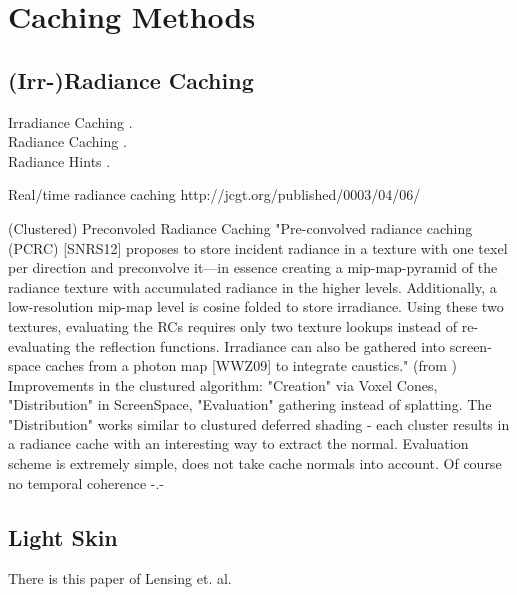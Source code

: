 \documentclass[thesis.tex]{subfiles}
\begin{document}

\section{Caching Methods}



\subsection{(Irr-)Radiance Caching}
Irradiance Caching \cite{bib:irradiancecaching}.\\

Radiance Caching \cite{bib:radiancecaching}.\\

Radiance Hints \cite{bib:radiancehints}.

Real/time radiance caching http://jcgt.org/published/0003/04/06/ \cite{bib:radiancecachechromaticcompression}

(Clustered) Preconvoled Radiance Caching \cite{bib:clusteredpreconvoledradiancecaching}
"Pre-convolved radiance caching (PCRC) [SNRS12] proposes to store incident radiance in a texture with one texel per direction and preconvolve it—in essence creating a mip-map-pyramid of the
radiance texture with accumulated radiance in the higher
levels. Additionally, a low-resolution mip-map level is cosine folded to store irradiance. Using these two textures, evaluating the RCs requires only two texture lookups instead of re-evaluating the reflection functions. Irradiance can also be gathered into screen-space caches from a photon map [WWZ09] to integrate caustics." (from \cite{bib:clusteredpreconvoledradiancecaching})\\
Improvements in the clustured algorithm: "Creation" via Voxel Cones, "Distribution" in ScreenSpace, "Evaluation" gathering instead of splatting. The "Distribution" works similar to clustured deferred shading - each cluster results in a radiance cache with an interesting way to extract the normal. Evaluation scheme is extremely simple, does not take cache normals into account. Of course no temporal coherence -.-



\subsection{Light Skin}
There is this paper \cite{bib:LightskinPaper} of Lensing et. al.
\end{document}
